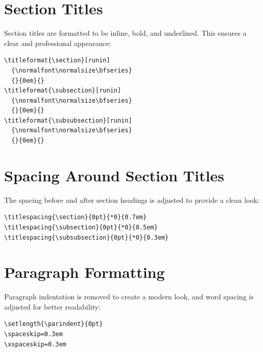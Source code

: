 \documentclass{article}
\begin{document}
\section{Section Titles}
Section titles are formatted to be inline, bold, and underlined. This ensures a clear and professional appearance:
\begin{verbatim}
\titleformat{\section}[runin]
  {\normalfont\normalsize\bfseries}
  {}{0em}{}
\titleformat{\subsection}[runin]
  {\normalfont\normalsize\bfseries}
  {}{0em}{}
\titleformat{\subsubsection}[runin]
  {\normalfont\normalsize\bfseries}
  {}{0em}{}
\end{verbatim}

\section{Spacing Around Section Titles}
The spacing before and after section headings is adjusted to provide a clean look:
\begin{verbatim}
\titlespacing{\section}{0pt}{*0}{0.7em}
\titlespacing{\subsection}{0pt}{*0}{0.5em}
\titlespacing{\subsubsection}{0pt}{*0}{0.3em}
\end{verbatim}

\section{Paragraph Formatting}
Paragraph indentation is removed to create a modern look, and word spacing is adjusted for better readability:
\begin{verbatim}
\setlength{\parindent}{0pt}
\spaceskip=0.3em
\xspaceskip=0.3em
\end{verbatim}
\end{document}
